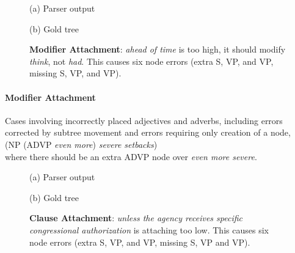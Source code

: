 \begin{figure}
\begin{center}

\vspace{3mm}
(a) Parser output

\vspace{6mm}


\vspace{3mm}
(b) Gold tree
\end{center}
\derivspace
\caption{
	\label{fig:modifier-attachment}
	\textbf{Modifier Attachment}: \emph{ahead of time} is too high, it should
	modify \emph{think}, not \emph{had}.  This causes six node errors (extra
	S, VP, and VP, missing S, VP, and VP).
}
\derivaftercompress
\end{figure}

\paragraph{Modifier Attachment} Cases involving incorrectly placed adjectives
and adverbs, including errors corrected by subtree movement and errors
requiring only creation of a node, \myeg \\ (NP (ADVP \emph{even more})
\emph{severe setbacks}) \\ where there should be an extra ADVP node over
\emph{even more severe}.

\begin{figure}
\begin{center}

\vspace{3mm}
(a) Parser output

\vspace{6mm}


\vspace{3mm}
(b) Gold tree
\end{center}
\derivspace
\caption{
	\label{fig:clause-attachment}
	\textbf{Clause Attachment}: \emph{unless the agency receives specific
	congressional authorization} is attaching too low. This causes six
	node errors (extra S, VP, and VP, missing S, VP and VP).
}
\derivaftercompress
\end{figure}

